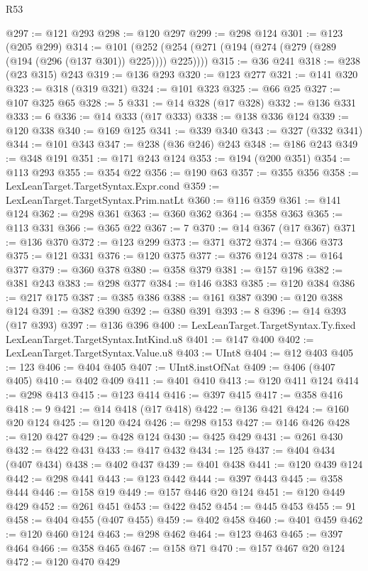 \begin{lexlean}{R53}
\begin{coremodule}
@297 := @121 @293
@298 := @120 @297
@299 := @298 @124
@301 := @123 (@205 @299)
@314 := @101 (@252 (@254 (@271 (@194 (@274 (@279 (@289 (@194 (@296 (@137 @301)) @225)))) @225))))
@315 := @36 @241
@318 := @238 (@23 @315) @243
@319 := @136 @293
@320 := @123 @277
@321 := @141 @320
@323 := @318 (@319 @321)
@324 := @101 @323
@325 := @66 @25
@327 := @107 @325 @65
@328 := 5
@331 := @14 @328 (@17 @328)
@332 := @136 @331
@333 := 6
@336 := @14 @333 (@17 @333)
@338 := @138 @336 @124
@339 := @120 @338
@340 := @169 @125
@341 := @339 @340
@343 := @327 (@332 @341)
@344 := @101 @343
@347 := @238 (@36 @246) @243
@348 := @186 @243
@349 := @348 @191
@351 := @171 @243 @124
@353 := @194 (@200 @351)
@354 := @113 @293
@355 := @354 @22
@356 := @190 @63
@357 := @355 @356
@358 := LexLeanTarget.TargetSyntax.Expr.cond
@359 := LexLeanTarget.TargetSyntax.Prim.natLt
@360 := @116 @359
@361 := @141 @124
@362 := @298 @361
@363 := @360 @362
@364 := @358 @363
@365 := @113 @331
@366 := @365 @22
@367 := 7
@370 := @14 @367 (@17 @367)
@371 := @136 @370
@372 := @123 @299
@373 := @371 @372
@374 := @366 @373
@375 := @121 @331
@376 := @120 @375
@377 := @376 @124
@378 := @164 @377
@379 := @360 @378
@380 := @358 @379
@381 := @157 @196
@382 := @381 @243
@383 := @298 @377
@384 := @146 @383
@385 := @120 @384
@386 := @217 @175
@387 := @385 @386
@388 := @161 @387
@390 := @120 @388 @124
@391 := @382 @390
@392 := @380 @391
@393 := 8
@396 := @14 @393 (@17 @393)
@397 := @136 @396
@400 := LexLeanTarget.TargetSyntax.Ty.fixed LexLeanTarget.TargetSyntax.IntKind.u8
@401 := @147 @400
@402 := LexLeanTarget.TargetSyntax.Value.u8
@403 := UInt8
@404 := @12 @403
@405 := 123
@406 := @404 @405
@407 := UInt8.instOfNat
@409 := @406 (@407 @405)
@410 := @402 @409
@411 := @401 @410
@413 := @120 @411 @124
@414 := @298 @413
@415 := @123 @414
@416 := @397 @415
@417 := @358 @416
@418 := 9
@421 := @14 @418 (@17 @418)
@422 := @136 @421
@424 := @160 @20 @124
@425 := @120 @424
@426 := @298 @153
@427 := @146 @426
@428 := @120 @427
@429 := @428 @124
@430 := @425 @429
@431 := @261 @430
@432 := @422 @431
@433 := @417 @432
@434 := 125
@437 := @404 @434 (@407 @434)
@438 := @402 @437
@439 := @401 @438
@441 := @120 @439 @124
@442 := @298 @441
@443 := @123 @442
@444 := @397 @443
@445 := @358 @444
@446 := @158 @19
@449 := @157 @446 @20 @124
@451 := @120 @449 @429
@452 := @261 @451
@453 := @422 @452
@454 := @445 @453
@455 := 91
@458 := @404 @455 (@407 @455)
@459 := @402 @458
@460 := @401 @459
@462 := @120 @460 @124
@463 := @298 @462
@464 := @123 @463
@465 := @397 @464
@466 := @358 @465
@467 := @158 @71
@470 := @157 @467 @20 @124
@472 := @120 @470 @429

\end{coremodule}
\end{lexlean}
